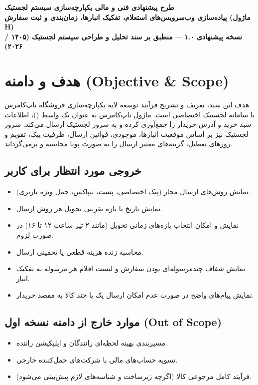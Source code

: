 \documentclass[11pt,a4paper]{article}
\begin{document}
\begin{center}
    \vspace*{0.5cm}
    {\Huge\bfseries طرح پیشنهادی فنی و مالی یکپارچه‌سازی سیستم لجستیک} \\[0.4cm]
    {\Large\bfseries پیاده‌سازی وب‌سرویس‌های استعلام، تفکیک انبارها، زمان‌بندی و ثبت سفارش (ماژول H)} \\[0.8cm]
    \textbf{نسخه پیشنهادی ۱.۰} --- \textbf{منطبق بر سند تحلیل و طراحی سیستم لجستیک (۱۴۰۵ / ۲۰۲۶)} \\[1.2cm]
\end{center}

\tableofcontents
\newpage

\section{هدف و دامنه (Objective \& Scope)}
هدف این سند، تعریف و تشریح فرآیند توسعه لایه یکپارچه‌سازی فروشگاه ناپ‌کامرس با سامانه لجستیک اختصاصی است. ماژول ناپ‌کامرس به عنوان یک واسط ()، اطلاعات سبد خرید و آدرس خریدار را جمع‌آوری کرده و به سرور لجستیک ارسال می‌کند. سرور لجستیک نیز بر اساس موقعیت انبارها، موجودی، قوانین ارسال، ظرفیت پیک، تقویم و روزهای تعطیل، گزینه‌های معتبر ارسال را به صورت پویا محاسبه و برمی‌گرداند.

\subsection{خروجی مورد انتظار برای کاربر}
\begin{itemize}
    \item نمایش روش‌های ارسال مجاز (پیک اختصاصی، پست، تیپاکس، حمل ویژه باربری).
    \item نمایش تاریخ یا بازه تقریبی تحویل هر روش ارسال.
    \item نمایش و امکان انتخاب بازه‌های زمانی تحویل (مانند ۲ تیر ساعت ۱۲ تا ۱۶) در صورت لزوم.
    \item محاسبه زنده هزینه قطعی یا تخمینی ارسال.
    \item نمایش شفاف چندمرسوله‌ای بودن سفارش و لیست اقلام هر مرسوله به تفکیک انبار.
    \item نمایش پیام‌های واضح در صورت عدم امکان ارسال یک یا چند کالا به مقصد خریدار.
\end{itemize}

\subsection{موارد خارج از دامنه نسخه اول (Out of Scope)}
\begin{itemize}
    \item مسیربندی بهینه لحظه‌ای رانندگان و اپلیکیشن راننده.
    \item تسویه حساب‌های مالی با شرکت‌های حمل‌کننده خارجی.
    \item فرآیند کامل مرجوعی کالا (اگرچه زیرساخت و شناسه‌های لازم پیش‌بینی می‌شود).
\end{itemize}
\end{document}
